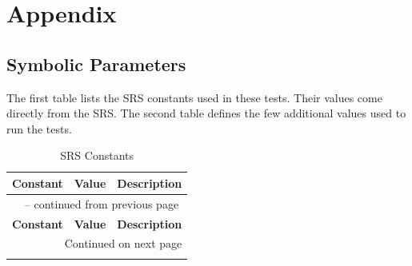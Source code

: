 \documentclass[10pt,titlepage]{article}
\begin{document}
\section{Appendix}

\subsection{Symbolic Parameters}\label{sec:VnVParameters}

The first table lists the SRS constants used in these tests. Their values
come directly from the SRS. The second
table defines the few additional values used to run the tests.

\begin{longtable}{@{}p{}p{}p{}@{}}
\caption{SRS Constants}\label{tab:VnVSRSConstants}\\

\toprule
\textbf{Constant} & \textbf{Value} & \textbf{Description}\\
\midrule
\endfirsthead

\multicolumn{3}{c}{\tablename\ \thetable{} -- continued from previous page}\\
\toprule
\textbf{Constant} & \textbf{Value} & \textbf{Description}\\
\midrule
\endhead

\midrule
\multicolumn{3}{r}{Continued on next page}\\
\endfoot


\end{longtable}
\end{document}
